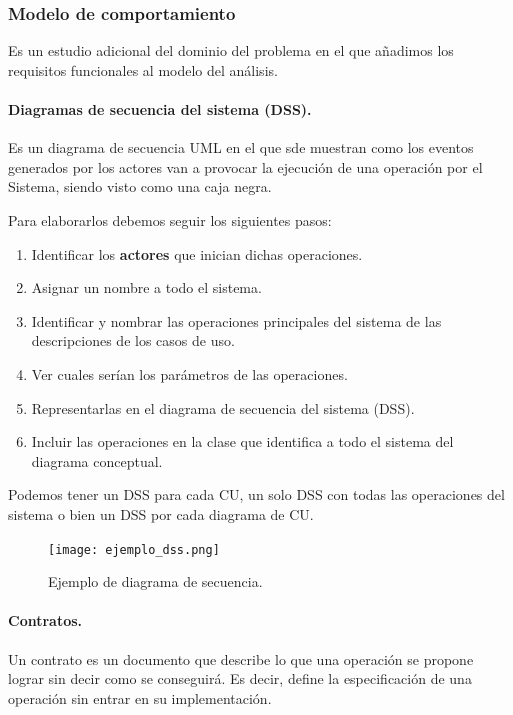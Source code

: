 \documentclass[12pt,spanish]{article}
\begin{document}
\subsubsection{Modelo de comportamiento}

Es un estudio adicional del dominio del problema en el que añadimos los requisitos funcionales al modelo del análisis.
\paragraph{Diagramas de secuencia del sistema (DSS).\\}

Es un diagrama de secuencia UML en el que sde muestran como los eventos generados por los actores van a provocar la ejecución de una operación por el Sistema, siendo visto como una caja negra.

Para elaborarlos debemos seguir los siguientes pasos:

\begin{enumerate}
	\item Identificar los \textbf{actores} que inician dichas operaciones.
	\item Asignar un nombre a todo el sistema.
	\item Identificar y nombrar las operaciones principales del sistema de las descripciones de los casos de uso.
	\item Ver cuales serían los parámetros de las operaciones.
	\item Representarlas en el diagrama de secuencia del sistema (DSS).
	\item Incluir las operaciones en la clase que identifica a todo el sistema del diagrama conceptual.
\end{enumerate}

Podemos tener un DSS para cada CU, un solo DSS con todas las operaciones del sistema o bien un DSS por cada diagrama de CU.

\begin{figure}[H]
\centering
\texttt{[image: ejemplo\_dss.png]}
\caption{Ejemplo de diagrama de secuencia.}
\end{figure}

\paragraph{Contratos.\\}

Un contrato es un documento que describe lo que una operación se propone lograr sin decir como se conseguirá. Es decir, define la especificación de una operación sin entrar en su implementación.\\
\end{document}
